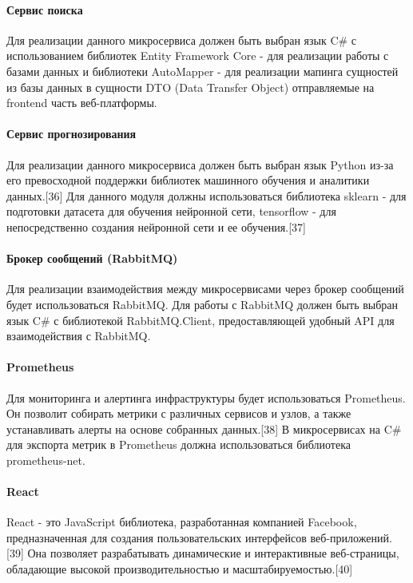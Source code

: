 \paragraph{Сервис поиска}

Для реализации данного микросервиса должен быть выбран язык C\# с использованием библиотек Entity Framework Core - для реализации работы с базами данных и библиотеки AutoMapper - для реализации мапинга сущностей из базы данных в сущности DTO (Data Transfer Object) отправляемые на frontend часть веб-платформы.

\paragraph{Сервис прогнозирования}

Для реализации данного микросервиса должен быть выбран язык Python из-за его превосходной поддержки библиотек машинного обучения и аналитики данных.[36] Для данного модуля должны использоваться библиотека sklearn - для подготовки датасета для обучения нейронной сети, tensorflow - для непосредственно создания нейронной сети и ее обучения.[37]

\paragraph{Брокер сообщений (RabbitMQ)}

Для реализации взаимодействия между микросервисами через брокер сообщений будет использоваться RabbitMQ. Для работы с RabbitMQ должен быть выбран язык C\# с библиотекой RabbitMQ.Client, предоставляющей удобный API для взаимодействия с RabbitMQ.

\paragraph{Prometheus}

Для мониторинга и алертинга инфраструктуры будет использоваться Prometheus. Он позволит собирать метрики с различных сервисов и узлов, а также устанавливать алерты на основе собранных данных.[38] В микросервисах на C\# для экспорта метрик в Prometheus должна использоваться библиотека prometheus-net.

\paragraph{React}

React - это JavaScript библиотека, разработанная компанией Facebook, предназначенная для создания пользовательских интерфейсов веб-приложений.[39] Она позволяет разрабатывать динамические и интерактивные веб-страницы, обладающие высокой производительностью и масштабируемостью.[40]


